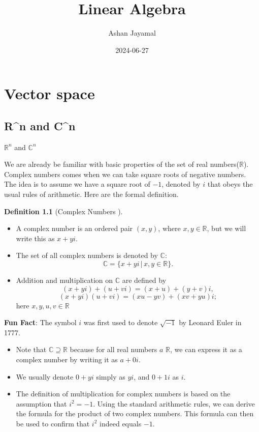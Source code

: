 \documentclass[
]{book}
\title{Linear Algebra}
\author{Ashan Jayamal}
\date{2024-06-27}
\providecommand{\tightlist}{%
  \setlength{\itemsep}{0pt}\setlength{\parskip}{0pt}}
\theoremstyle{definition}
\newtheorem{definition}{Definition}[chapter]
\theoremstyle{definition}
\theoremstyle{definition}
\theoremstyle{definition}
\theoremstyle{remark}
\begin{document}
\maketitle

{
\setcounter{tocdepth}{1}
\tableofcontents
}
\chapter{Vector space}\label{vector-space}

\section{R\^{}n and C\^{}n}\label{rn-and-cn}

\(\mathbb{R}^n\) and \(\mathbb{C}^n\)

We are already be familiar with basic properties of the set of real numbers(\(\mathbb{R}\)). Complex numbers comes when we can take square roots of negative numbers. The idea is to assume we have a square root of \(−1\), denoted by \(i\) that obeys the usual rules of arithmetic. Here are the formal definition.

\begin{definition}[Complex Numbers ]
\protect\hypertarget{def:unnamed-chunk-1}{}\label{def:unnamed-chunk-1}\leavevmode

\begin{itemize}
\tightlist
\item
  A complex number is an ordered pair \((x, y)\), where \(x, y \in \mathbb{R}\), but we will write this as \(x + yi\).
\item
  The set of all complex numbers is denoted by \(\mathbb{C}\):
  \[\mathbb{C} = \{x + yi \,|\, x, y \in \mathbb{R}\}.\]
\item
  Addition and multiplication on \(\mathbb{C}\) are defined by
  \[(x + yi) + (u + vi) = (x + u) + (y + v)i,\]
  \[(x + yi)(u + vi) = (xu - yv) + (xv + yu)i;\]
  here \(x, y, u, v \in \mathbb{R}\)
\end{itemize}

\end{definition}

\textbf{Fun Fact}: The symbol \(i\) was first used to denote \(\sqrt{-1}\) by Leonard Euler in 1777.

\begin{itemize}
\tightlist
\item
  Note that \(\mathbb{C} \supseteq \mathbb{R}\) because for all real numbers \(a\) \(\mathbb{R}\), we can express it as a complex number by writing it as \(a + 0i\).
\item
  We usually denote \(0 + yi\) simply as \(yi\), and \(0 + 1i\) as \(i\).
\item
  The definition of multiplication for complex numbers is based on the assumption that \(i^2 = -1\). Using the standard arithmetic rules, we can derive the formula for the product of two complex numbers. This formula can then be used to confirm that \(i^2\) indeed equals \(-1\).
\end{itemize}
\end{document}
